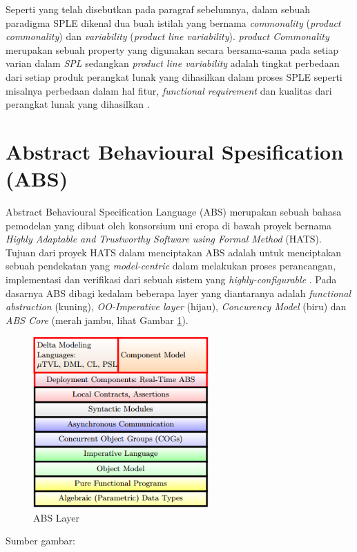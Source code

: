 Seperti yang telah disebutkan pada paragraf sebelumnya, dalam sebuah paradigma SPLE dikenal dua buah istilah yang bernama \textit{commonality} (\textit{product commonality}) dan \textit{variability} (\textit{product line variability}). \textit{product Commonality} merupakan sebuah property yang digunakan secara bersama-sama pada setiap varian dalam \textit{SPL} sedangkan \textit{product line variability} adalah tingkat perbedaan dari setiap produk perangkat lunak yang dihasilkan dalam proses SPLE seperti misalnya perbedaan dalam hal fitur, \textit{functional requirement} dan kualitas dari perangkat lunak yang dihasilkan \cite{metzger2014software}.

\section{Abstract Behavioural Spesification (ABS)}

Abstract Behavioural Specification Language (ABS) merupakan sebuah bahasa pemodelan yang dibuat oleh konsorsium uni eropa di bawah proyek bernama \textit{Highly Adaptable and Trustworthy Software using Formal Method} (HATS). Tujuan dari proyek HATS dalam menciptakan ABS adalah untuk menciptakan sebuah pendekatan yang \textit{model-centric} dalam melakukan proses perancangan, implementasi dan verifikasi dari sebuah sistem yang \textit{highly-configurable} \citep{clarke2012variability}. Pada dasarnya ABS dibagi kedalam beberapa layer yang diantaranya adalah \textit{functional abstraction} (kuning), \textit{OO-Imperative layer} (hijau), \textit{Concurency Model} (biru) dan \textit{ABS Core} (merah jambu, lihat Gambar \ref{fig:absLayer}). \\

\begin{figure}
    \centering
    \includegraphics[width=0.6\textwidth]
        {img/abs-layers.png}
    \caption{ABS Layer}
    \label{fig:absLayer}
\end{figure}
\vspace{-0.8cm}
\begin{center}
{\small Sumber gambar: \citep{hahnle2013hats}}
\end{center}

